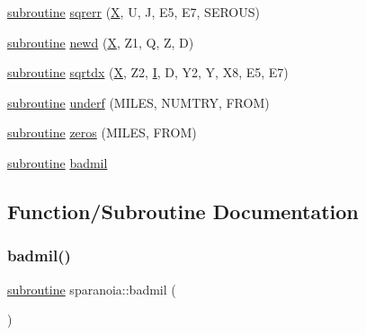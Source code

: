 \begin{DoxyCompactItemize}
\item 
\hyperlink{M__stopwatch_83_8txt_acfbcff50169d691ff02d4a123ed70482}{subroutine} \hyperlink{sparanoia_8f90_a8a741debf119a02e8107542c840aa910}{sqrerr} (\hyperlink{intro__blas1_83_8txt_ac8596739bc875e90fe6e2ecf98e87906}{X}, U, J, E5, E7, S\+E\+R\+O\+US)
\item 
\hyperlink{M__stopwatch_83_8txt_acfbcff50169d691ff02d4a123ed70482}{subroutine} \hyperlink{sparanoia_8f90_a1a7c7f32e1cdfae6821cd45ce4579c29}{newd} (\hyperlink{intro__blas1_83_8txt_ac8596739bc875e90fe6e2ecf98e87906}{X}, Z1, Q, Z, D)
\item 
\hyperlink{M__stopwatch_83_8txt_acfbcff50169d691ff02d4a123ed70482}{subroutine} \hyperlink{sparanoia_8f90_a010907bd382f4842772e76ab8fd7263a}{sqrtdx} (\hyperlink{intro__blas1_83_8txt_ac8596739bc875e90fe6e2ecf98e87906}{X}, Z2, \hyperlink{continue_87_8txt_ae7b8826453d28f1bdb2fba7e889eb23b}{I}, D, Y2, Y, X8, E5, E7)
\item 
\hyperlink{M__stopwatch_83_8txt_acfbcff50169d691ff02d4a123ed70482}{subroutine} \hyperlink{sparanoia_8f90_a147b84087576e0dcdf30b8e154e1422b}{underf} (M\+I\+L\+ES, N\+U\+M\+T\+RY, F\+R\+OM)
\item 
\hyperlink{M__stopwatch_83_8txt_acfbcff50169d691ff02d4a123ed70482}{subroutine} \hyperlink{sparanoia_8f90_afbd0ce3d8d240b13d4a3746cc40f2619}{zeros} (M\+I\+L\+ES, F\+R\+OM)
\item 
\hyperlink{M__stopwatch_83_8txt_acfbcff50169d691ff02d4a123ed70482}{subroutine} \hyperlink{sparanoia_8f90_a49f63ae992dadfe521dc8e94b0b2045e}{badmil}
\end{DoxyCompactItemize}


\subsection{Function/\+Subroutine Documentation}
\mbox{\label{sparanoia_8f90_a49f63ae992dadfe521dc8e94b0b2045e}} 
\subsubsection{\texorpdfstring{badmil()}{badmil()}}
{\footnotesize\ttfamily \hyperlink{M__stopwatch_83_8txt_acfbcff50169d691ff02d4a123ed70482}{subroutine} sparanoia\+::badmil (\begin{DoxyParamCaption}{ }\end{DoxyParamCaption})}

